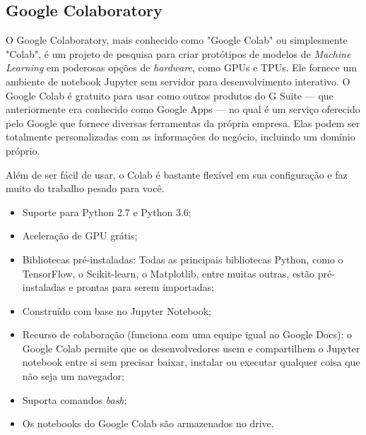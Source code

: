\subsection{Google Colaboratory}
O Google Colaboratory, mais conhecido como "Google Colab" ou simplesmente "Colab", é um projeto de pesquisa para criar protótipos de modelos de \textit{Machine Learning} em poderosas opções de \textit{hardware}, como GPUs e TPUs. Ele fornece um ambiente de notebook Jupyter sem servidor para desenvolvimento interativo. O Google Colab é gratuito para usar como outros produtos do G Suite — que anteriormente era conhecido como Google Apps — no qual é um serviço oferecido pelo Google que fornece diversas ferramentas da própria empresa. Elas podem ser totalmente personalizadas com as informações do negócio, incluindo um domínio próprio.

Além de ser fácil de usar, o Colab é bastante flexível em sua configuração e faz muito do trabalho pesado para você. \cite{colabdetail}

\begin{itemize}
    \item Suporte para Python 2.7 e Python 3.6;
    \item Aceleração de GPU grátis;
    \item Bibliotecas pré-instaladas: Todas as principais bibliotecas Python, como o TensorFlow, o Scikit-learn, o Matplotlib, entre muitas outras, estão pré-instaladas e prontas para serem importadas;
    \item Construído com base no Jupyter Notebook;
    \item Recurso de colaboração (funciona com uma equipe igual ao Google Docs): o Google Colab permite que os desenvolvedores usem e compartilhem o Jupyter notebook entre si sem precisar baixar, instalar ou executar qualquer coisa que não seja um navegador;
    \item Suporta comandos \textit{bash};
    \item Os notebooks do Google Colab são armazenados no drive.
\end{itemize}

